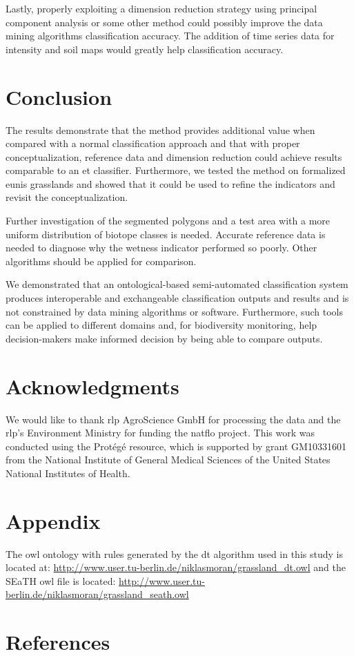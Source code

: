 \documentclass[authoryear,review,12pt,number]{elsarticle}
\begin{document}
Lastly, properly exploiting a dimension reduction strategy using principal 
component analysis or some other method could possibly improve the data mining 
algorithms classification accuracy. The addition of time series data for 
intensity and soil maps would greatly help classification accuracy.
\section{Conclusion}
The results demonstrate that the method provides additional value when compared 
with a normal classification approach and that with proper conceptualization, 
reference data and dimension reduction could achieve results comparable to an 
\gls{et} classifier. Furthermore, we tested the method on formalized 
\gls{eunis} grasslands and showed that it could be used to refine the 
indicators and revisit the conceptualization. 

Further investigation of the segmented polygons and a test area with a more
uniform distribution of biotope classes is needed. Accurate reference data is
needed to diagnose why the wetness indicator performed so poorly. Other 
algorithms should be applied for comparison.

We demonstrated that an ontological-based semi-automated classification system
produces interoperable and exchangeable classification outputs
and results and is not constrained by data mining
algorithms or software. Furthermore, such tools can be applied to different 
domains and, for biodiversity monitoring, help decision-makers make informed 
decision by being able to compare outputs.
\section{Acknowledgments}
We would like to thank \gls{rlp} AgroScience GmbH for processing the data and 
the \gls{rlp}'s Environment Ministry for funding the \gls{natflo} project. This 
work was conducted using the Prot\'eg\'e resource, which is supported by grant 
GM10331601 from the National Institute of General Medical Sciences of the 
United States National Institutes of Health.
\section{Appendix}
The \gls{owl} ontology with rules generated by the \gls{dt} algorithm used in 
this study is located at: 
\url{http://www.user.tu-berlin.de/niklasmoran/grassland_dt.owl} and the SEaTH 
\gls{owl} file is located: 
\url{http://www.user.tu-berlin.de/niklasmoran/grassland_seath.owl}

\section{References}

\end{document}
